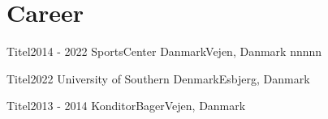 \section{Career}
\mySubHeadingListStart

  \mySubHeading
  {Titel}{2014 - 2022}
  {SportsCenter Danmark}{Vejen, Danmark}
    \myItemListStart
      nnnnn
    \myItemListEnd

  \mySubHeading
  {Titel}{2022}
  {University of Southern Denmark}{Esbjerg, Danmark}
    \myItemListStart
    \myItemListEnd

  \mySubHeading
  {Titel}{2013 - 2014}
  {KonditorBager}{Vejen, Danmark}
    \myItemListStart
    \myItemListEnd

\mySubHeadingListEnd
